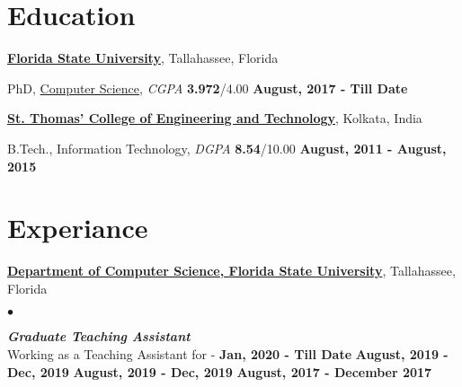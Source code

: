 \documentclass[margin,line]{res}
\newenvironment{list1}{
  \begin{list}{\ding{113}}{%
      \setlength{\itemsep}{0in}
      \setlength{\parsep}{0in} \setlength{\parskip}{0in}
      \setlength{\topsep}{0in} \setlength{\partopsep}{0in} 
      \setlength{\leftmargin}{0.17in}}}{\end{list}}
\newenvironment{list2}{
  \begin{list}{$\bullet$}{%
      \setlength{\itemsep}{0in}
      \setlength{\parsep}{0in} \setlength{\parskip}{0in}
      \setlength{\topsep}{0in} \setlength{\partopsep}{0in} 
      \setlength{\leftmargin}{0.2in}}}{\end{list}}
\begin{document}
\begin{resume}
\vspace*{-.18in}

\section{\sc Education}
{\bf \href{http://www.fsu.edu}{Florida State University}}, Tallahassee, 
Florida\\
\vspace*{-.18in}
\begin{list1}
	\item[] PhD, \href{http://www.cs.fsu.edu/}{Computer Science}, \textit{CGPA} 
	\textbf{3.972}/4.00 \hfill {\bf August, 2017 - Till Date}
\end{list1}
\vspace*{-.18in}
{\bf \href{http://www.stcet.org/}{St. Thomas' College of Engineering and 
		Technology}}, Kolkata, India\\
\vspace*{-.18in}
\begin{list1}
	\item[] B.Tech., Information Technology,
	\textit{DGPA} \textbf{8.54}/10.00 \hfill {\bf August, 2011 - August, 2015}
\end{list1}

\vspace*{-.18in}

\section{\sc Experiance}
{\bf \href{http://www.cs.fsu.edu/}{Department of Computer Science, Florida 
State University}}, Tallahassee, Florida
\begin{list2}
\item \textbf{{\em Graduate Teaching Assistant}}\\
Working as a Teaching Assistant for -
 \hfill {\bf Jan, 2020 - 
Till Date}
 \hfill {\bf August, 2019 - Dec, 
2019}
 \hfill {\bf August, 2019 - Dec, 2019}
 \hfill {\bf August, 2017 - December 2017}


\end{list2}
\end{resume}
\end{document}
